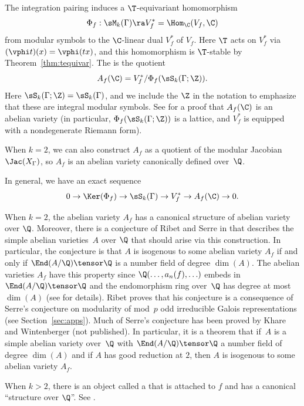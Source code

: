The integration pairing induces a $\T$-equivariant homomorphism 
$$ 
  \Phi_f : \sM_k(\Gamma) \ra V_f^* = \Hom_\C(V_f,\C)
$$
from modular symbols to the $\C$-linear dual $V_f^*$ of $V_f$.
Here $\T$ acts on $V_f^*$ via $(\vphi t)(x) = \vphi(tx)$,
and this homomorphism is $\T$-stable by Theorem~\ref{thm:tequivar}.
The  is the
quotient 
$$
  A_f(\C) = V_f^*/\Phi_f(\sS_k(\Gamma;\Z)).
$$
Here $\sS_k(\Gamma;\Z)=\sS_k(\Gamma)$, and we include
the $\Z$ in the notation to emphasize that
these are integral modular symbols.
See \cite{shimura:surles} for a proof that $A_f(\C)$
is an abelian variety (in particular, 
$\Phi_f(\sS_k(\Gamma;\Z))$ is a lattice, and 
$V_f^*$ is equipped with a nondegenerate Riemann form).

When $k=2$, we can also construct $A_f$ as a quotient
of the modular Jacobian $\Jac(X_\Gamma)$, so $A_f$ is an 
abelian variety canonically defined over~$\Q$.

In general, we have an exact sequence
$$
  0 \to \Ker(\Phi_f) \to  \sS_k(\Gamma) \to V_f^* \to A_f(\C) \to 0.
$$


\begin{remark}
  When $k=2$, the abelian variety $A_f$ has a canonical structure of
  abelian variety over $\Q$.  Moreover, there is a conjecture of Ribet
  and Serre in \cite{ribet:abvars} that describes the simple abelian
  varieties~$A$ over $\Q$ that should arise via this construction.  In
  particular, the conjecture is that $A$ is isogenous to some abelian
  variety $A_f$ if and only if $\End(A/\Q)\tensor\Q$ is a number field
  of degree $\dim(A)$.  The abelian varieties $A_f$ have this property
  since $\Q(\ldots, a_n(f),\ldots)$ embeds in $\End(A/\Q)\tensor\Q$
  and the endomorphism ring over~$\Q$ has degree at most $\dim(A)$
  (see \cite{ribet:abvars} for details).  Ribet proves that his
  conjecture is a consequence of Serre's conjecture
  \cite{serre:conjectures} on modularity of mod~$p$ odd irreducible
  Galois representations (see Section~\ref{sec:apps}).  Much of Serre's
  conjecture has been proved by Khare and Wintenberger (not
  published).  In particular, it is a theorem that if~$A$ is a simple
  abelian variety over~$\Q$ with $\End(A/\Q)\tensor\Q$ a number field
  of degree $\dim(A)$ and if $A$ has good reduction at $2$, then $A$ is
  isogenous to some abelian variety $A_f$.
\end{remark}

\begin{remark}
  When $k>2$, there is an object called a
   that is attached to $f$ and has a canonical
  ``structure over $\Q$''.  See \cite{scholl:motivesinvent}.
\end{remark}





